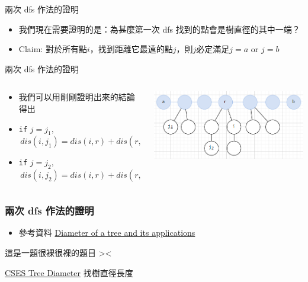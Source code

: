 \documentclass[aspectratio=169]{beamer}
\begin{document}
    \begin{frame}{兩次 dfs 作法的證明}
        \begin{itemize}
            \item 我們現在需要證明的是：為甚麼第一次 dfs 找到的點會是樹直徑的其中一端？
            \item Claim: 對於所有點$i$，找到距離它最遠的點$j$，則$j$必定滿足$j=a$ or $j=b$ 
        \end{itemize}
    \end{frame}
    \begin{frame}{兩次 dfs 作法的證明}
    \begin{columns}
    \begin{column}{0.5\textwidth}
        \begin{itemize}
            \item 我們可以用剛剛證明出來的結論得出
            \item<2-> \texttt{if} $j=j_1,$\\
            $\,dis(i,j_1)=dis(i,r)+dis(r,j_1)\leq dis(i,r)+dis(r,a)=dis(i,a)$
            \item<2-> \texttt{if} $j=j_2,$\\
            $\,dis(i,j_2)= dis(i,r)+dis(r,j_2)\leq dis(i,r)+dis(r,a)=dis(i,a)$
        \end{itemize}
    \end{column}
    \begin{column}{0.5\textwidth}
        \includegraphics[width=\textwidth]{images/dfs_proof_2.png}
    \end{column}
    \end{columns}
    \end{frame}
    \begin{frame}
        \frametitle{兩次 dfs 作法的證明}
        \begin{itemize}
            \item 參考資料 \href{https://codeforces.com/blog/entry/101271}{Diameter of a tree and its applications}
        \end{itemize}
    \end{frame}
    \begin{frame}{這是一題很裸很裸的題目 ><}
        \begin{block}{\href{https://cses.fi/problemset/task/1131}{CSES Tree Diameter}}
        找樹直徑長度
        \end{block}
    \end{frame}
    
\end{document}
